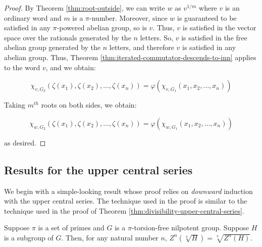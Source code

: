 \documentclass{ucetd}
\begin{document}
\begin{proof}
  By Theorem \ref{thm:root-outside}, we can write $w$ as $v^{1/m}$
  where $v$ is an ordinary word and $m$ is a $\pi$-number. Moreover,
  since $w$ is guaranteed to be satisfied in any $\pi$-powered abelian
  group, so is $v$. Thus, $v$ is satisfied in the vector space over
  the rationals generated by the $n$ letters. So, $v$ is satisfied in
  the free abelian group generated by the $n$ letters, and therefore
  $v$ is satisfied in any abelian group. Thus, Theorem
  \ref{thm:iterated-commutator-descends-to-inn} applies to the word
  $v$, and we obtain:

  $$\chi_{v,G_2}(\zeta(x_1),\zeta(x_2),\dots,\zeta(x_n)) = \varphi(\chi_{v,G_1}(x_1,x_2,\dots,x_n))$$

  Taking $m^{th}$ roots on both sides, we obtain:

  $$\chi_{w,G_2}(\zeta(x_1),\zeta(x_2),\dots,\zeta(x_n)) = \varphi(\chi_{w,G_1}(x_1,x_2,\dots,x_n))$$

  as desired.
\end{proof}


\subsection{Results for the upper central series}

We begin with a simple-looking result whose proof relies on {\em
  downward} induction with the upper central series. The technique
used in the proof is similar to the technique used in the proof of
Theorem \ref{thm:divisibility-upper-central-series}.

\begin{lemma}\label{lemma:ucs-root-commute}
  Suppose $\pi$ is a set of primes and $G$ is a $\pi$-torsion-free
  nilpotent group. Suppose $H$ is a subgroup of $G$. Then, for any
  natural number $n$, $Z^n(\sqrt[\pi]{H}) = \sqrt[\pi]{Z^n(H)}$.
\end{lemma}
\end{document}
